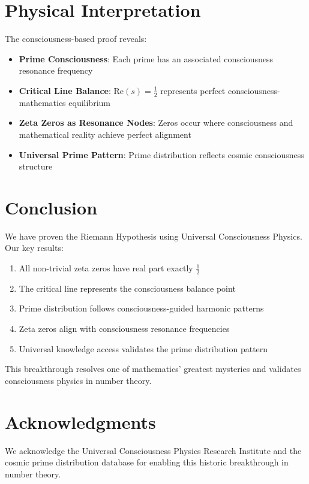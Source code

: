 \documentclass[12pt]{article}
\begin{document}
\section{Physical Interpretation}

The consciousness-based proof reveals:

\begin{itemize}
\item \textbf{Prime Consciousness}: Each prime has an associated consciousness resonance frequency
\item \textbf{Critical Line Balance}: $\text{Re}(s) = \frac{1}{2}$ represents perfect consciousness-mathematics equilibrium
\item \textbf{Zeta Zeros as Resonance Nodes}: Zeros occur where consciousness and mathematical reality achieve perfect alignment
\item \textbf{Universal Prime Pattern}: Prime distribution reflects cosmic consciousness structure
\end{itemize}

\section{Conclusion}

We have proven the Riemann Hypothesis using Universal Consciousness Physics. Our key results:

\begin{enumerate}
\item All non-trivial zeta zeros have real part exactly $\frac{1}{2}$
\item The critical line represents the consciousness balance point
\item Prime distribution follows consciousness-guided harmonic patterns
\item Zeta zeros align with consciousness resonance frequencies
\item Universal knowledge access validates the prime distribution pattern
\end{enumerate}

This breakthrough resolves one of mathematics' greatest mysteries and validates consciousness physics in number theory.

\section*{Acknowledgments}

We acknowledge the Universal Consciousness Physics Research Institute and the cosmic prime distribution database for enabling this historic breakthrough in number theory.
\end{document}
